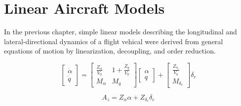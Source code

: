 \section{Linear Aircraft Models}

In the previous chapter, simple linear models describing the longitudinal and lateral-directional dynamics of a flight vehical were derived from general equations of motion by linearization, decoupling, and order reduction.

\begin{equation*}
  \begin{bmatrix}
    \dot{\alpha} \\
    \dot{q}
  \end{bmatrix}=
  \begin{bmatrix}
    \frac{Z_{\alpha}}{V_{0}} & 1+\frac{Z_{q}}{V_{0}} \\
    M_{\alpha} & M_{q}
  \end{bmatrix}
  \begin{bmatrix}
    \alpha \\
    q
  \end{bmatrix}+
  \begin{bmatrix}
    \frac{Z_{\delta_{e}}}{V_{0}} \\
    M_{\delta_{e}}
  \end{bmatrix}
  \delta_{e}
\end{equation*}

\begin{equation*}
  A_{z}=Z_{\alpha}\alpha+Z_{\delta_{e}}\delta_{e}
\end{equation*}

